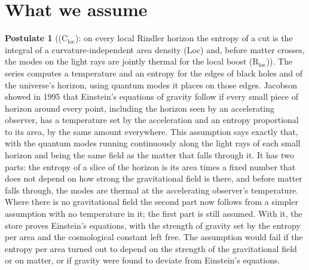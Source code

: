 \documentclass[11pt]{article}
\theoremstyle{definition}
\newtheorem{postulate}[theorem]{Postulate}
\theoremstyle{plain}
\begin{document}
\section{What we assume}

\begin{postulate}[(C$_{\mathrm{loc}}$): on every local Rindler horizon the entropy of a cut is the integral of a curvature-independent area density (Loc) and, before matter crosses, the modes on the light rays are jointly thermal for the local boost (R$_{\mathrm{loc}}$)]\label{c:synthesis.c-loc-local-horizon-premise}
The series computes a temperature and an entropy for the edges of black holes and of the universe's horizon, using quantum modes it places on those edges. Jacobson showed in 1995 that Einstein's equations of gravity follow if every small piece of horizon around every point, including the horizon seen by an accelerating observer, has a temperature set by the acceleration and an entropy proportional to its area, by the same amount everywhere. This assumption says exactly that, with the quantum modes running continuously along the light rays of each small horizon and being the same field as the matter that falls through it. It has two parts: the entropy of a slice of the horizon is its area times a fixed number that does not depend on how strong the gravitational field is there, and before matter falls through, the modes are thermal at the accelerating observer's temperature. Where there is no gravitational field the second part now follows from a simpler assumption with no temperature in it; the first part is still assumed. With it, the store proves Einstein's equations, with the strength of gravity set by the entropy per area and the cosmological constant left free. The assumption would fail if the entropy per area turned out to depend on the strength of the gravitational field or on matter, or if gravity were found to deviate from Einstein's equations.
\end{postulate}
\end{document}
